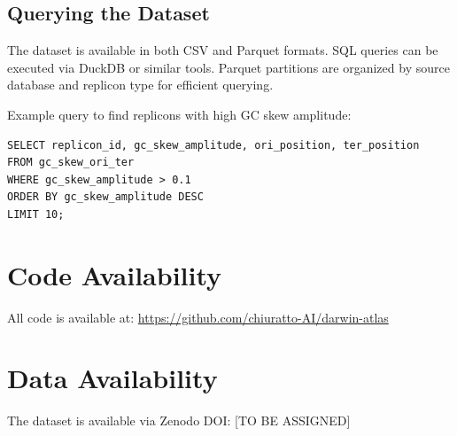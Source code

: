 \documentclass[12pt,a4paper]{article}
\begin{document}
\subsection{Querying the Dataset}
The dataset is available in both CSV and Parquet formats. SQL queries can be executed via DuckDB or similar tools. Parquet partitions are organized by source database and replicon type for efficient querying.

Example query to find replicons with high GC skew amplitude:
\begin{verbatim}
SELECT replicon_id, gc_skew_amplitude, ori_position, ter_position
FROM gc_skew_ori_ter
WHERE gc_skew_amplitude > 0.1
ORDER BY gc_skew_amplitude DESC
LIMIT 10;
\end{verbatim}

\section{Code Availability}

All code is available at: \url{https://github.com/chiuratto-AI/darwin-atlas}

\section{Data Availability}

The dataset is available via Zenodo DOI: [TO BE ASSIGNED]



\end{document}
